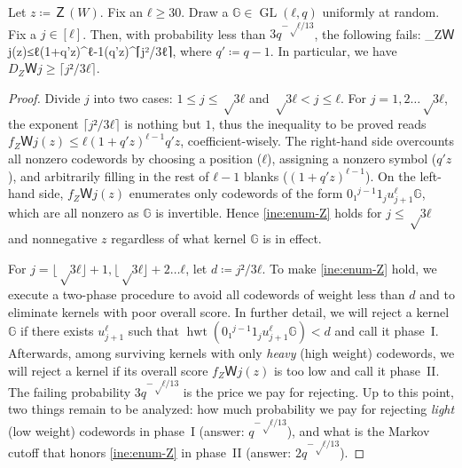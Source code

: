 \documentclass[openany]{amsbook}
\numberwithin{equation}{chapter}
\numberwithin{figure}{chapter}
\numberwithin{table}{chapter}
\DeclareMathOperator\hwt{hwt}
\DeclareMathOperator\GL{GL}
\def\[#1\]{\begin{equation*}{#1}\end{equation*}}
\theoremstyle{definition}	理dfn:Definition~?s			理exa:Example~?s
\theoremstyle{remark}		理cla:Claim~?s				理rem:Remark~?s
\begin{document}
	\begin{thm}\label{thm:typical-LDP}
		Let $z≔Ｚ(W)$.
		Fix an $ℓ≥30$.
		Draw a $𝔾∈\GL(ℓ,q)$ uniformly at random.
		Fix a $j∈[ℓ]$.
		Then, with probability less than $3q^{-√ℓ/13}$, the following fails:
		\[f_ZＷj(z)≤ℓ(1+q'z)^{ℓ-1}(q'z)^{⌈j²/3ℓ⌉},\label{ine:enum-Z}\]
		where $q'≔q-1$.
		In particular, we have $D_ZＷj≥⌈j²/3ℓ⌉$.
	\end{thm}
	
	\begin{proof}
		Divide $j$ into two cases: $1≤j≤√{3ℓ}$ and $√{3ℓ}<j≤ℓ$.
		For $j=1,2…√{3ℓ}$, the exponent $⌈j²/3ℓ⌉$ is nothing but $1$,
		thus the inequality to be proved reads
		$f_ZＷj(z)≤ℓ{(1+q'z)^{ℓ-1}}q'z$, coefficient-wisely.
		The right-hand side overcounts all nonzero codewords by
		choosing a position ($ℓ$), assigning a nonzero symbol ($q'z$),
		and arbitrarily filling in the rest of $ℓ-1$ blanks ($(1+q'z)^{ℓ-1}$).
		On the left-hand side, $f_ZＷj(z)$ enumerates only codewords of the form
		$0₁^{j-1}1_ju_{j+1}^ℓ𝔾$, which are all nonzero as $𝔾$ is invertible.
		Hence \cref{ine:enum-Z} holds for $j≤√{3ℓ}$ and nonnegative $z$
		regardless of what kernel $𝔾$ is in effect.
		
		For $j=⌊√{3ℓ}⌋+1,⌊√{3ℓ}⌋+2…ℓ$, let $d≔j²/3ℓ$.
		To make \cref{ine:enum-Z} hold, we execute a two-phase procedure
		to avoid all codewords of weight less than $d$
		and to eliminate kernels with poor overall score.
		In further detail, we will reject a kernel $𝔾$ if there exists $u_{j+1}^ℓ$
		such that $\hwt(0₁^{j-1}1_ju_{j+1}^ℓ𝔾)<d$ and call it phase~I\@.
		Afterwards, among surviving kernels with only \emph{heavy}
		(high weight) codewords, we will reject a kernel if its overall score
		$f_ZＷj(z)$ is too low and call it phase~II\@.
		The failing probability $3q^{-√ℓ/13}$ is the price we pay for rejecting.
		Up to this point, two things remain to be analyzed:
		how much probability we pay for rejecting \emph{light}
		(low weight) codewords in phase~I (answer: $q^{-√ℓ/13}$),
		and what is the Markov cutoff that honors \cref{ine:enum-Z}
		in phase~II (answer: $2q^{-√ℓ/13}$).
		

\end{proof}
\end{document}
